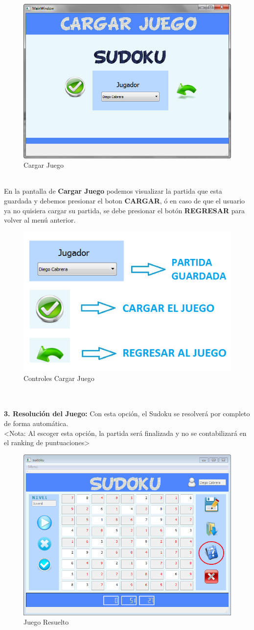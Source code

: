 \begin{figure}[htbp]
\begin{center}
\includegraphics[width=.50\textwidth]{./imagenes/MenuCargar.png}
\caption{Cargar Juego}
\label{Cargar Juego}
\end{center}
\end{figure} 

\ \\ En la pantalla de \textbf{Cargar Juego} podemos visualizar la partida que esta guardada y debemos presionar el boton \textbf{CARGAR}, ó en caso de que el usuario ya no quisiera cargar su partida, se debe presionar el botón \textbf{REGRESAR} para volver al menú anterior.

\begin{figure}[htbp]
\begin{center}
\includegraphics[width=.50\textwidth]{./imagenes/Controles3.png}
\caption{Controles Cargar Juego}
\label{Controles Cargar Juego}
\end{center}
\end{figure} 

\ \\ \ \\ \textbf{3. Resolución del Juego:} Con esta opción, el Sudoku se resolverá por completo de forma automática. \\ <Nota: Al escoger esta opción, la partida será finalizada y no se contabilizará en el ranking de puntuaciones>

\begin{figure}[htbp]
\begin{center}
\includegraphics[width=.50\textwidth]{./imagenes/JuegoResuelto.png}
\caption{Juego Resuelto}
\label{Juego Resuelto}
\end{center}
\end{figure} 

